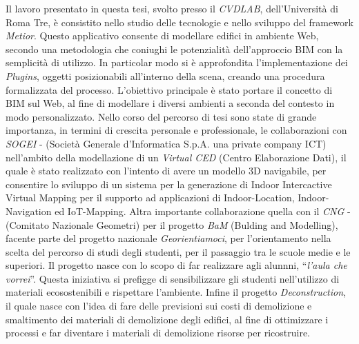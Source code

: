 Il lavoro presentato in questa tesi, svolto presso il \emph{CVDLAB},
dell'Università di Roma Tre, è consistito nello studio delle tecnologie e nello sviluppo del
framework \emph{Metior}.
Questo applicativo consente di modellare edifici in ambiente Web, secondo una metodologia che coniughi le potenzialità
dell’approccio BIM con la semplicità di utilizzo.
In particolar modo si è approfondita l'implementazione dei \emph{Plugins}, oggetti posizionabili all'interno della scena, creando
una procedura formalizzata del processo.
L'obiettivo principale è stato portare il concetto di BIM sul Web, al fine di modellare i diversi ambienti a seconda del
contesto in modo personalizzato.
Nello corso del percorso di tesi sono state di grande importanza, in termini di crescita personale e professionale,
le collaborazioni con \emph{SOGEI} - (Società Generale d'Informatica S.p.A. una private company ICT)
nell'ambito della modellazione di un \emph{Virtual CED} (Centro Elaborazione Dati),
il quale \`e stato realizzato con l'intento di avere un modello 3D navigabile, per consentire lo sviluppo di un sistema per
la generazione di Indoor Intercactive Virtual Mapping per il supporto ad applicazioni di Indoor-Location, Indoor-Navigation
ed IoT-Mapping.
Altra importante collaborazione quella con il \emph{CNG} - (Comitato Nazionale Geometri) per il progetto \emph{BaM} (Bulding and Modelling),
facente parte del progetto nazionale \emph{Georientiamoci}, per l'orientamento nella scelta del percorso di studi degli studenti,
per il passaggio tra le scuole medie e le superiori.
Il progetto nasce con lo scopo di far realizzare agli alunnni, ``\emph{l'aula che vorrei}''.
Questa iniziativa si prefigge di sensibilizzare gli studenti nell'utilizzo di
materiali ecosostenibili e rispettare l'ambiente.
Infine il progetto \emph{Deconstruction}, il quale nasce con l'idea di fare delle previsioni
sui costi di demolizione e smaltimento dei materiali di demolizione degli edifici, al fine di ottimizzare i processi e far
diventare i materiali di demolizione risorse per ricostruire.
